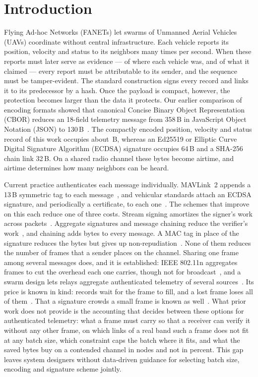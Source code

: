 \documentclass[lineno,pdflatex,sn-mathphys-num]{sn-jnl}
\renewcommand{\_}{\authbcunderscore\allowbreak}
\begin{document}
\section{Introduction}\label{sec:intro}
Flying Ad-hoc Networks (FANETs) let swarms of Unmanned Aerial Vehicles (UAVs) coordinate without
central infrastructure. Each vehicle reports its position, velocity and status to its neighbors
many times per second. When these reports must later serve as evidence --- of where each vehicle
was, and of what it claimed --- every report must be attributable to its sender, and the
sequence must be tamper-evident. The standard construction signs every record and links it to
its predecessor by a hash. Once the payload is compact, however, the protection becomes larger
than the data it protects. Our earlier comparison of encoding formats showed that canonical
Concise Binary Object Representation (CBOR) reduces an 18-field telemetry message from 358\,B in
JavaScript Object Notation (JSON) to 130\,B~\cite{farouk2026encoding}. The compactly encoded
position, velocity and status record of this work occupies about \keyLean\,B, whereas an Ed25519
or Elliptic Curve Digital Signature Algorithm (ECDSA) signature occupies 64\,B and a SHA-256
chain link 32\,B. On a shared radio channel these bytes become airtime, and airtime determines
how many neighbors can be heard.

Current practice authenticates each message individually. MAVLink~2 appends a 13\,B symmetric
tag to each message~\cite{mavlink2signing}, and vehicular standards attach an ECDSA signature,
and periodically a certificate, to each one~\cite{etsi_ts103097}. The schemes that improve on
this each reduce one of three costs. Stream signing amortizes the signer's work across
packets~\cite{gennaro1997streams,wong1999flows,perrig2000emss}. Aggregate signatures and message
chaining reduce the verifier's work~\cite{li2025clas,cominetti2022chaining}, and chaining adds
bytes to every message. A MAC tag in place of the signature reduces the bytes but gives up
non-repudiation~\cite{mavlink2signing,perrig2002tesla}. None of them reduces the number of frames
that a sender places on the channel. Sharing one frame among several messages does, and it is
established: IEEE 802.11n aggregates frames to cut the overhead each one carries, though not
for broadcast~\cite{skordoulis2008aggregation}, and a swarm design lets relays aggregate
authenticated telemetry of several sources~\cite{rotta2024telemetrybroadcast}. Its price is known
in kind: records wait for the frame to fill, and a lost frame loses all of
them~\cite{skordoulis2008aggregation}. That a signature crowds
a small frame is known as well~\cite{gundogan2021firmware}. What prior work does not provide is
the accounting that decides between these options for authenticated telemetry: what a frame must
carry so that a receiver can verify it without any other frame, on which links of a real band
such a frame does not fit at any batch size, which constraint caps the batch where it fits, and
what the saved bytes buy on a contended channel in nodes and not in percent. This gap leaves
system designers without data-driven guidance for selecting batch size, encoding and signature
scheme jointly.
\end{document}
